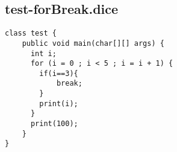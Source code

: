 \subsection{test-forBreak.dice}
\begin{verbatim}
class test {
	public void main(char[][] args) {
	  int i;
	  for (i = 0 ; i < 5 ; i = i + 1) {
	  	if(i==3){
	  		break;
	  	}
	    print(i);
	  }
	  print(100);
	}
}


\end{verbatim}